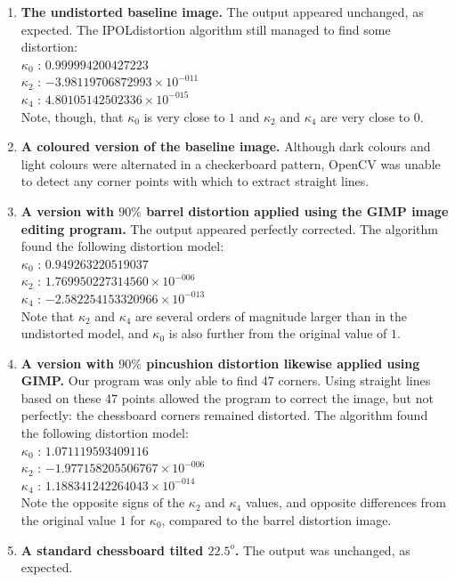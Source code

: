 \begin{enumerate}
  \item \textbf{The undistorted baseline image.} The output appeared unchanged, as expected. The IPOLdistortion algorithm still managed to find some distortion:\\
   $ \kappa_{0}$ : $0.999994200427223$\\
   $ \kappa_{2}$ : $-3.98119706872993 \times 10^{-011}$\\
   $ \kappa_{4}$ : $4.80105142502336 \times 10^{-015}$\\
   Note, though, that $\kappa_{0}$ is very close to $1$ and $\kappa_{2}$ and $\kappa_{4}$ are very close to $0$.
  \item \textbf{A coloured version of the baseline image.} Although dark colours and light colours were alternated in a checkerboard pattern, OpenCV was unable to detect any corner points with which to extract straight lines.
  \item \textbf{A version with $90\%$ barrel distortion applied using the GIMP image editing program.} The output appeared perfectly corrected. The algorithm found the following distortion model:\\
   $ \kappa_{0}$ : $0.949263220519037$\\
   $ \kappa_{2}$ : $1.769950227314560 \times 10^{-006}$\\
   $ \kappa_{4}$ : $-2.582254153320966 \times 10^{-013}$\\
   Note that $\kappa_{2}$ and $\kappa_{4}$ are several orders of magnitude larger than in the undistorted model, and $\kappa_{0}$ is also further from the original value of $1$.
  \item \textbf{A version with $90\%$ pincushion distortion likewise applied using GIMP.} Our program was only able to find 47 corners. Using straight lines based on these 47 points allowed the program to correct the image, but not perfectly: the chessboard corners remained distorted. The algorithm found the following distortion model:\\
   $ \kappa_{0}$ : $1.071119593409116$\\
   $ \kappa_{2}$ : $-1.977158205506767 \times 10^{-006}$\\
   $ \kappa_{4}$ : $1.188341242264043 \times 10^{-014}$\\
   Note the opposite signs of the $\kappa_{2}$ and $\kappa_{4}$ values, and opposite differences from the original value $1$ for $\kappa_{0}$, compared to the barrel distortion image.
  \item \textbf{A standard chessboard tilted $22.5^o$.} The output was unchanged, as expected.

\end{enumerate}

